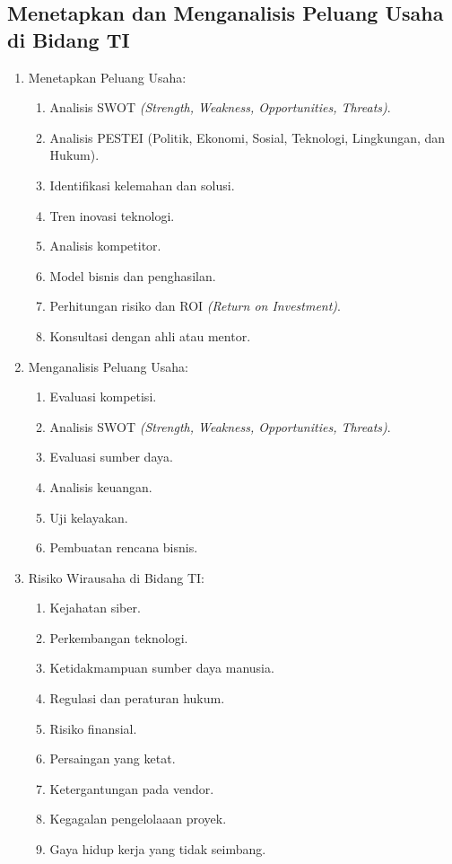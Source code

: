 \subsection{Menetapkan dan Menganalisis Peluang Usaha di Bidang TI}
\begin{enumerate}
\item Menetapkan Peluang Usaha:
  \begin{enumerate}
  \item Analisis SWOT \textit{(Strength, Weakness, Opportunities, Threats)}.
  \item Analisis PESTEI (Politik, Ekonomi, Sosial, Teknologi, Lingkungan, dan Hukum).
  \item Identifikasi kelemahan dan solusi.
  \item Tren inovasi teknologi.
  \item Analisis kompetitor.
  \item Model bisnis dan penghasilan.
  \item Perhitungan risiko dan ROI \textit{(Return on Investment)}.
  \item Konsultasi dengan ahli atau mentor.
  \end{enumerate}
\item Menganalisis Peluang Usaha:
  \begin{enumerate}
  \item Evaluasi kompetisi.
  \item Analisis SWOT \textit{(Strength, Weakness, Opportunities, Threats)}.
  \item Evaluasi sumber daya.
  \item Analisis keuangan.
  \item Uji kelayakan.
  \item Pembuatan rencana bisnis.
  \end{enumerate}
\item Risiko Wirausaha di Bidang TI:
  \begin{enumerate}
  \item Kejahatan siber.
  \item Perkembangan teknologi.
  \item Ketidakmampuan sumber daya manusia.
  \item Regulasi dan peraturan hukum.
  \item Risiko finansial.
  \item Persaingan yang ketat.
  \item Ketergantungan pada vendor.
  \item Kegagalan pengelolaaan proyek.
  \item Gaya hidup kerja yang tidak seimbang.

\end{enumerate}
\end{enumerate}
